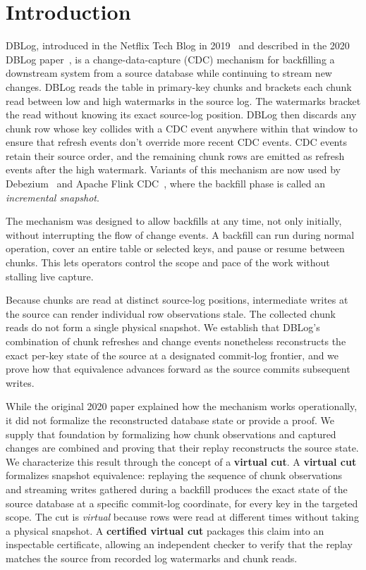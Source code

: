 \documentclass[letterpaper,10pt,twocolumn]{article}
\begin{document}
\section{Introduction}\label{introduction}

DBLog, introduced in the Netflix Tech Blog in 2019~\citep{dblog_netflix_blog} 
and described in the 2020 DBLog paper~\citep{andreakis2020dblog}, is a 
change-data-capture (CDC) mechanism for backfilling a downstream system from a
source database while continuing to stream new changes. DBLog reads the 
table in primary-key chunks and brackets each chunk read between low and high 
watermarks in the source log. The watermarks bracket the read without
knowing its exact source-log position. DBLog then discards any chunk row
whose key collides with a CDC event anywhere within that window to ensure
that refresh events don't override more recent CDC events. CDC events
retain their source order, and the remaining chunk rows are emitted as
refresh events after the high watermark. Variants of this mechanism are now used by
Debezium~\citep{debezium_incremental_snapshot} and Apache Flink 
CDC~\citep{flink_cdc_incremental_snapshot}, where the backfill phase 
is called an \emph{incremental snapshot}.

The mechanism was designed to allow backfills at any time, not only
initially, without interrupting the flow of change events. A backfill 
can run during normal operation, cover an entire table or selected keys, 
and pause or resume between chunks. This lets operators control the 
scope and pace of the work without stalling live capture.

Because chunks are read at distinct source-log positions, intermediate writes 
at the source can render individual row observations stale. The collected chunk reads
 do not form a single physical snapshot. We establish that DBLog's 
combination of chunk refreshes and change events nonetheless reconstructs 
the exact per-key state of the source at a designated commit-log frontier, 
and we prove how that equivalence advances forward as the source commits 
subsequent writes.

While the original 2020 paper explained how the mechanism works operationally, 
it did not formalize the reconstructed database state or provide a proof. 
We supply that foundation by formalizing how chunk observations and captured
changes are combined and proving that their replay reconstructs the source
state. We characterize this result through the concept of a
\textbf{virtual cut}. A
\textbf{virtual cut} formalizes snapshot equivalence: replaying the sequence 
of chunk observations and streaming writes gathered during a backfill produces 
the exact state of the source database at a specific commit-log coordinate, for 
every key in the targeted scope. The cut is \emph{virtual} because rows were read 
at different times without taking a physical snapshot. A \textbf{certified virtual cut} 
packages this claim into an inspectable certificate, allowing an independent checker 
to verify that the replay matches the source from recorded log watermarks and chunk 
reads.
\end{document}
